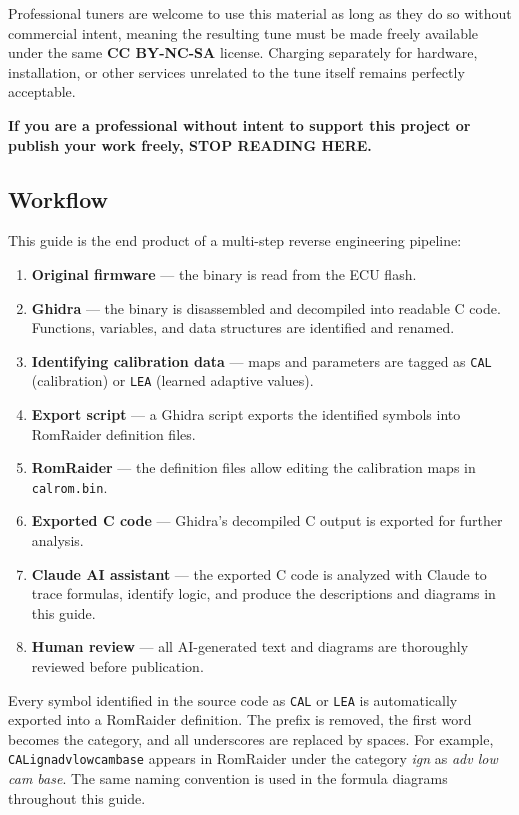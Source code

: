 \documentclass[a4paper,11pt]{article}
\renewcommand{\_}{\oldunderscore\allowbreak}
\begin{document}
Professional tuners are welcome to use this material as long as they do so
without commercial intent, meaning the resulting tune must be made freely
available under the same \textbf{CC BY-NC-SA} license. Charging separately
for hardware, installation, or other services unrelated to the tune itself
remains perfectly acceptable.

\textbf{If you are a professional without intent to support this project or
publish your work freely, STOP READING HERE.}

\subsection{Workflow}

This guide is the end product of a multi-step reverse engineering pipeline:

\begin{enumerate}
	\item \textbf{Original firmware} --- the binary is read from the ECU flash.
	\item \textbf{Ghidra} --- the binary is disassembled and decompiled into
	      readable C code. Functions, variables, and data structures are
	      identified and renamed.
	\item \textbf{Identifying calibration data} --- maps and parameters are
	      tagged as \texttt{CAL\_} (calibration) or \texttt{LEA\_} (learned
	      adaptive values).
	\item \textbf{Export script} --- a Ghidra script exports the identified
	      symbols into RomRaider definition files.
	\item \textbf{RomRaider} --- the definition files allow editing the
	      calibration maps in \texttt{calrom.bin}.
	\item \textbf{Exported C code} --- Ghidra's decompiled C output is
	      exported for further analysis.
	\item \textbf{Claude AI assistant} --- the exported C code is analyzed
	      with Claude to trace formulas, identify logic, and produce the
	      descriptions and diagrams in this guide.
	\item \textbf{Human review} --- all AI-generated text and diagrams are
	      thoroughly reviewed before publication.
\end{enumerate}

Every symbol identified in the source code as \texttt{CAL\_} or \texttt{LEA\_}
is automatically exported into a RomRaider definition. The prefix is removed,
the first word becomes the category, and all underscores are replaced by
spaces. For example, \texttt{CAL\_ign\_adv\_low\_cam\_base} appears in
RomRaider under the category \emph{ign} as \emph{adv low cam base}. The same
naming convention is used in the formula diagrams throughout this guide.
\end{document}
